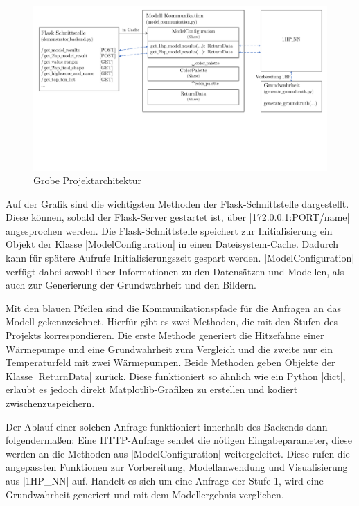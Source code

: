\documentclass[a4paper]{extarticle}
\begin{document}
    \begin{figure}[H]
        \centering
        \includegraphics[trim={0cm 6cm 0cm 0}, clip, width=\linewidth]{bilder/architektur_backend.pdf}
        \caption{Grobe Projektarchitektur} \label{fig:architektur-backend}
    \end{figure}

    Auf der Grafik sind die wichtigsten Methoden der Flask-Schnittstelle dargestellt.
    Diese können, sobald der Flask-Server gestartet ist, über |172.0.0.1:PORT/name| angesprochen werden.
    Die Flask-Schnittstelle speichert zur Initialisierung ein Objekt der Klasse |ModelConfiguration| in einen Dateisystem-Cache.
    Dadurch kann für spätere Aufrufe Initialisierungszeit gespart werden.
    |ModelConfiguration| verfügt dabei sowohl über Informationen zu den Datensätzen und Modellen, als auch zur Generierung der Grundwahrheit und den Bildern.

    Mit den blauen Pfeilen sind die Kommunikationspfade für die Anfragen an das Modell gekennzeichnet. 
    Hierfür gibt es zwei Methoden, die mit den Stufen des Projekts korrespondieren. 
    Die erste Methode generiert die Hitzefahne einer Wärmepumpe und eine Grundwahrheit zum Vergleich und die zweite nur ein Temperaturfeld mit zwei Wärmepumpen.
    Beide Methoden geben Objekte der Klasse |ReturnData| zurück. 
    Diese funktioniert so ähnlich wie ein Python |dict|, erlaubt es jedoch direkt Matplotlib-Grafiken zu erstellen und kodiert zwischenzuspeichern.

    Der Ablauf einer solchen Anfrage funktioniert innerhalb des Backends dann folgendermaßen:
    Eine HTTP-Anfrage sendet die nötigen Eingabeparameter, diese werden an die Methoden aus |ModelConfiguration| weitergeleitet.
    Diese rufen die angepassten Funktionen zur Vorbereitung, Modellanwendung und Visualisierung aus |1HP_NN| auf.
    Handelt es sich um eine Anfrage der Stufe 1, wird eine Grundwahrheit generiert und mit dem Modellergebnis verglichen.
\end{document}
